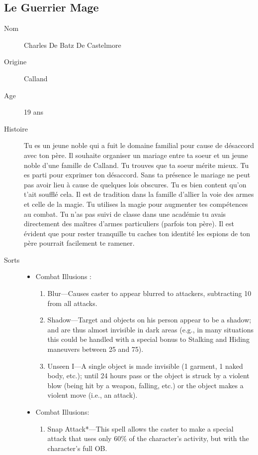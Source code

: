 \documentclass[oneside,12pt]{book}
\begin{document}
\begin{flushleft}
\subsection{Le Guerrier Mage}
\begin{description}
\item[Nom]{Charles De Batz De Castelmore}
\item[Origine]{Calland}
\item[Age]{19 ans}
\item[Histoire]{
\small Tu es un jeune noble qui a fuit le domaine familial pour cause de désaccord avec ton père. Il souhaite organiser un mariage entre ta soeur et un jeune noble d'une famille de Calland. Tu trouves que ta soeur mérite mieux. Tu es parti pour exprimer ton désaccord. Sans ta présence le mariage ne peut pas avoir lieu à cause de quelques lois obscures. Tu es bien content qu'on t'ait soufflé cela. Il est de tradition dans la famille d'allier la voie des armes et celle de la magie. Tu utilises la magie pour augmenter tes compétences au combat. Tu n'as pas suivi de classe dans une académie tu avais directement des maîtres d'armes particuliers (parfois ton père). Il est évident que pour rester tranquille tu caches ton identité les espions de ton père pourrait facilement te ramener. }
\item[Sorts]{
\begin{itemize}
\item Combat Illusions :
\begin{enumerate}
\scriptsize
\item Blur—Causes caster to appear blurred to attackers,
subtracting 10 from all attacks.
\item Shadow—Target and objects on his person appear to
be a shadow; and are thus almost invisible in dark
areas (e.g., in many situations this could be handled
with a special bonus to Stalking and Hiding maneuvers
between 25 and 75).
\item Unseen I—A single object is made invisible (1 garment, 1
naked body, etc.); until 24 hours pass or the object is
struck by a violent blow (being hit by a weapon, falling,
etc.) or the object makes a violent move (i.e., an attack).
\end{enumerate}
\item Combat Illusions:
\begin{enumerate}
\scriptsize
\item Snap Attack*—This spell allows the caster to make a
special attack that uses only 60\% of the character’s
activity, but with the character’s full OB.

\end{enumerate}
\end{itemize}}
\end{description}
\end{flushleft}
\end{document}
